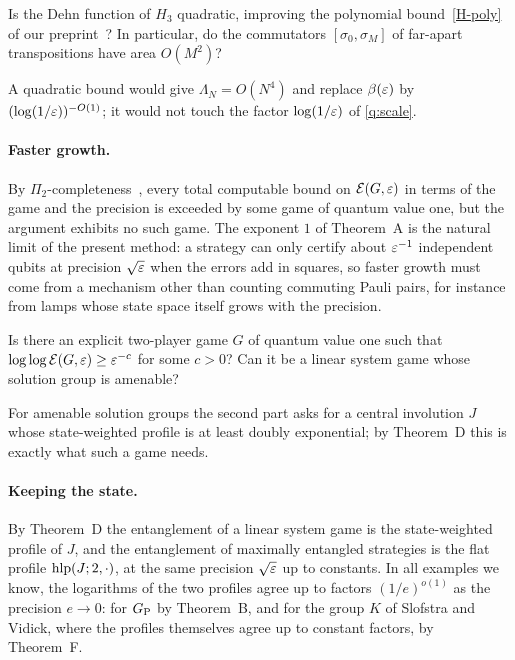 \begin{question}\label{q:dehn}
Is the Dehn function of $H_3$ quadratic, improving the polynomial bound~\ref{H-poly} of our preprint~\cite{DM-H3}? In particular, do the commutators $[\sigma_0,\sigma_M]$ of far-apart transpositions have area $O(M^2)$?
\end{question}

A quadratic bound would give $\Lambda_N=O(N^4)$ and replace $\beta(\varepsilon)$ by $(\log(1/\varepsilon))^{-O(1)}$; it would not touch the factor
$\log(1/\varepsilon)$ of \cref{q:scale}.

\paragraph{Faster growth.} By $\Pi_2$-completeness~\cite{MNY22}, every total computable bound on $\mathcal E(G,\varepsilon)$ in terms of the game and
the precision is exceeded by some game of quantum value one, but the argument exhibits no such game. The exponent $1$ of Theorem~A is the
natural limit of the present method: a strategy can only certify about $\varepsilon^{-1}$ independent qubits
at precision $\sqrt{\varepsilon}$ when the errors add in squares, so faster growth must come from a mechanism other than counting commuting Pauli
pairs, for instance from lamps whose state space itself grows with the precision.

\begin{question}\label{q:faster}
Is there an explicit two-player game $G$ of quantum value one such that $\log\log\mathcal E(G,\varepsilon)\ge\varepsilon^{-c}$ for some $c>0$? Can it be a
linear system game whose solution group is amenable?
\end{question}

For amenable solution groups the second part asks for a central involution $J$ whose state-weighted profile is at least doubly
exponential; by Theorem~D this is exactly what such a game needs.

\paragraph{Keeping the state.} By Theorem~D the entanglement of a linear system game is the state-weighted profile of $J$, and the
entanglement of maximally entangled strategies is the flat profile $\operatorname{hlp}(J;2,\cdot)$, at the same precision $\sqrt{\varepsilon}$ up to constants.
In all examples we know, the logarithms of the two profiles agree up to factors $(1/e)^{o(1)}$ as the precision $e\to0$: for $G_{\mathrm P}$ by Theorem~B, and for the group
$K$ of Slofstra and Vidick, where the profiles themselves agree up to constant factors, by Theorem~F.

